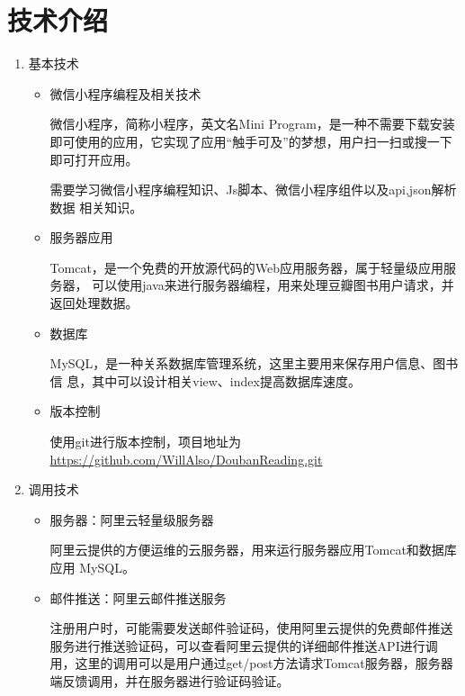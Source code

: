 \documentclass[a4paper,12pt]{ctexrep}
\begin{document}
	\section{技术介绍}
	\begin{enumerate}
		\item 基本技术
		\begin{itemize}
			\item 微信小程序编程及相关技术
			\par 微信小程序，简称小程序，英文名Mini Program，是一种不需要下载安装即可使用的应用，它实现了应用“触手可及”的梦想，用户扫一扫或搜一下即可打开应用。
			\par 需要学习微信小程序编程知识、Js脚本、微信小程序组件以及api,json解析数据
			相关知识。
			\item 服务器应用
			\par Tomcat，是一个免费的开放源代码的Web应用服务器，属于轻量级应用服务器，
			可以使用java来进行服务器编程，用来处理豆瓣图书用户请求，并返回处理数据。
			\item 数据库
			\par MySQL，是一种关系数据库管理系统，这里主要用来保存用户信息、图书信
			息，其中可以设计相关view、index提高数据库速度。
			\item 版本控制
			\par 使用git进行版本控制，项目地址为\\ 
			\url{https://github.com/WillAlso/DoubanReading.git}
		\end{itemize}
		\item 调用技术
		\begin{itemize}
			\item 服务器：阿里云轻量级服务器
			\par 阿里云提供的方便运维的云服务器，用来运行服务器应用Tomcat和数据库应用
			MySQL。
			\item 邮件推送：阿里云邮件推送服务
			\par 注册用户时，可能需要发送邮件验证码，使用阿里云提供的免费邮件推送服务进行推送验证码，可以查看阿里云提供的详细邮件推送API进行调用，这里的调用可以是用户通过get/post方法请求Tomcat服务器，服务器端反馈调用，并在服务器进行验证码验证。
		\end{itemize}
	\end{enumerate}
\end{document}

